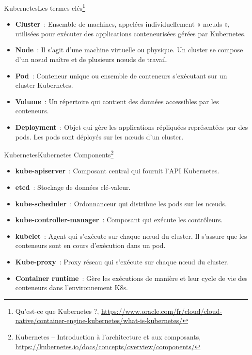 \documentclass{beamer}
\begin{document}
    \begin{frame}{Kubernetes}{Les termes clés\footnote{\label{k8soracle}Qu’est-ce que Kubernetes ?, \url{https://www.oracle.com/fr/cloud/cloud-native/container-engine-kubernetes/what-is-kubernetes/}}}
        \begin{itemize}
            \item \textbf{Cluster}~: Ensemble de machines, appelées individuellement « nœuds », utilisées pour exécuter des applications conteneurisées gérées par Kubernetes.
            \item \textbf{Node}~: Il s'agit d'une machine virtuelle ou physique.
            Un cluster se compose d'un nœud maître et de plusieurs nœuds de travail.
            \item \textbf{Pod}~: Conteneur unique ou ensemble de conteneurs s’exécutant sur un cluster Kubernetes.
            \item \textbf{Volume}~: Un répertoire qui contient des données accessibles par les conteneurs.
            \item \textbf{Deployment}~: Objet qui gère les applications répliquées représentées par des pods.
            Les pods sont déployés sur les nœuds d’un cluster.
        \end{itemize}
    \end{frame}

    \begin{frame}{Kubernetes}{Kubernetes Components\footnote{\label{k8scompnents}Kubernetes – Introduction à l’architecture et aux composants, \url{https://kubernetes.io/docs/concepts/overview/components/}}}
        \begin{itemize}
            \item \textbf{kube-apiserver}~: Composant central qui fournit l'API Kubernetes.
            \item \textbf{etcd}~: Stockage de données clé-valeur.
            \item \textbf{kube-scheduler}~: Ordonnanceur qui distribue les pods sur les nœuds.
            \item \textbf{kube-controller-manager}~: Composant qui exécute les contrôleurs.
            \item \textbf{kubelet}~: Agent qui s'exécute sur chaque nœud du cluster.
            Il s'assure que les conteneurs sont en cours d'exécution dans un pod.
            \item \textbf{Kube-proxy}~: Proxy réseau qui s'exécute sur chaque nœud du cluster.
            \item \textbf{Container runtime}~: Gère les exécutions de manière  et leur cycle de vie des conteneurs dans l'environnement K8s.
        \end{itemize}
    \end{frame}
\end{document}
